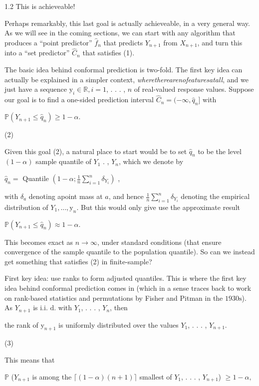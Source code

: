 \documentclass[a4paper,12pt]{article}
\begin{document}
1.2 This is achieveable!

Perhaps remarkably, this last goal is actually achieveable, in a very general way. As we will see in the coming sections, we can start with any algorithm that produces a “point predictor” $\hat{f}_{n}$ that predicts $Y_{n+1}$ from $X_{n+1}$, and turn this into a “set predictor” $\hat{C}_{n}$ that satisfies (1).

The basic idea behind conformal prediction is two-fold. The first key idea can actually be explained in a simpler context, {\it where}{\it there}{\it are}{\it no}{\it features}{\it at}{\it all}, and we just have a sequence $\mathrm{y}_{i}\in \mathbb{R}, i=1$, . . . , $n$ of real-valued response values. Suppose our goal is to find a one-sided prediction interval $\hat{C}_{n}=(-\infty,\hat{q}_{n}$] with

$\mathbb{P}(Y_{n+1}\leq\hat{q}_{n})\geq 1-\alpha.$

(2)

Given this goal (2), a natural place to start would be to set $\hat{q}_{n}$ to be the level $(1-\alpha)$ sample quantile of $Y_{1}$ . , $Y_{n}$, which we denote by

$\hat{q}_{n}=$ Quantile $(1-\displaystyle \alpha;\frac{1}{n}\sum_{i=1}^{n}\delta_{Y_{i}})$ ,

with $\delta_{a}$ denoting apoint mass at $a$, and hence $\displaystyle \frac{1}{n}\sum_{i=1}^{n}\delta_{Y_{i}}$ denoting the empirical distribution of $Y_{1}, \ldots, \mathrm{y}_{n}.$ But this would only give use the approximate result

$\mathbb{P}(Y_{n+1}\leq\hat{q}_{n})\approx 1-\alpha.$

This becomes exact as $ n\rightarrow\infty$, under standard conditions (that ensure convergence of the sample quantile to the population quantile). So can we instead get something that satisfies (2) in finite-sample?

First key idea: use ranks to form adjusted quantiles. This is where the first key idea behind conformal prediction comes in (which in a sense traces back to work on rank-based statistics and permutations by Fisher and Pitman in the $1930\mathrm{s}$). As $Y_{n+1}$ is i.i. $\mathrm{d}$. with $Y_{1}$, . . . , $Y_{n}$, then

the rank of $\mathrm{y}_{n+1}$ is uniformly distributed over the values $Y_{1}$, . . . , $Y_{n+1}.$

(3)

This means that

$\mathbb{P}$ ($Y_{n+1}$ is among the $\lceil(1-\alpha)(n+1)\rceil$ smallest of $Y_{1}$, . . . , $Y_{n+1}$) $\geq 1-\alpha,$
\end{document}
